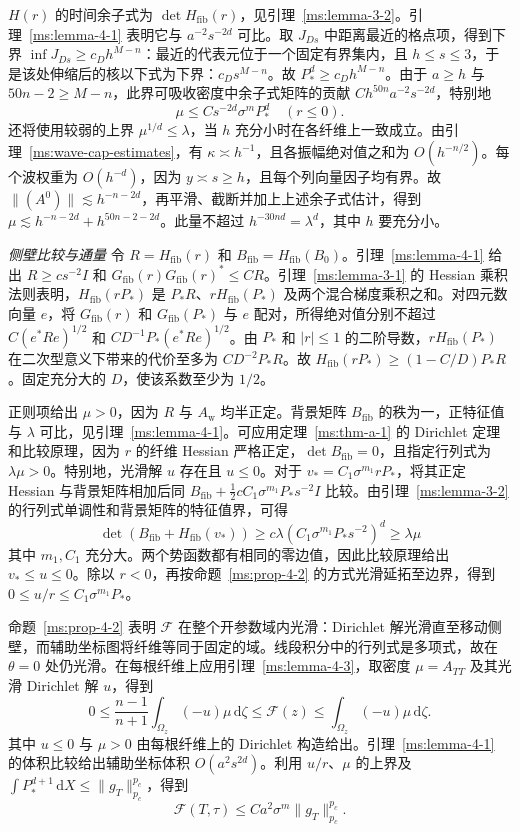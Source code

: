 $H(r)$ 的时间余子式为 $\det H_{\mathrm{fib}}(r)$，见引理~\ref{ms:lemma-3-2}。引理~\ref{ms:lemma-4-1} 表明它与 $a^{-2}s^{-2d}$ 可比。取 $J_{Ds}$ 中距离最近的格点项，得到下界 $\inf J_{Ds}\ge c_D h^{M-n}$：最近的代表元位于一个固定有界集内，且 $h\le s\le3$，于是该处伸缩后的核以下式为下界：$c_Ds^{M-n}$。故 $P_*^d\ge c_Dh^{M-n}$。由于 $a\ge h$ 与 $50n-2\ge M-n$，此界可吸收密度中余子式矩阵的贡献 $Ch^{50n}a^{-2}s^{-2d}$，特别地
\[
\mu\le Cs^{-2d}\sigma^mP_*^d\quad(r\le0).
\]
还将使用较弱的上界 $\mu^{1/d}\le\lambda$，当 $h$ 充分小时在各纤维上一致成立。由引理~\ref{ms:wave-cap-estimates}，有 $\kappa\asymp h^{-1}$，且各振幅绝对值之和为 $O(h^{-n/2})$。每个波权重为 $O(h^{-d})$，因为 $y\asymp s\ge h$，且每个列向量因子均有界。故 $\|(A^0)\|\lesssim h^{-n-2d}$，再平滑、截断并加上上述余子式估计，得到 $\mu\lesssim h^{-n-2d}+h^{50n-2-2d}$。此量不超过 $h^{-30nd}=\lambda^d$，其中 $h$ 要充分小。

\smallskip
\noindent\textit{侧壁比较与通量}
令 $R=H_{\mathrm{fib}}(r)$ 和 $B_{\mathrm{fib}}=H_{\mathrm{fib}}(B_0)$。引理~\ref{ms:lemma-4-1} 给出 $R\ge cs^{-2}I$ 和 $G_{\mathrm{fib}}(r)G_{\mathrm{fib}}(r)^*\le CR$。引理~\ref{ms:lemma-3-1} 的 Hessian 乘积法则表明，$H_{\mathrm{fib}}(rP_*)$ 是 $P_*R$、$rH_{\mathrm{fib}}(P_*)$ 及两个混合梯度乘积之和。对四元数向量 $e$，将 $G_{\mathrm{fib}}(r)$ 和 $G_{\mathrm{fib}}(P_*)$ 与 $e$ 配对，所得绝对值分别不超过 $C(e^*Re)^{1/2}$ 和 $CD^{-1}P_*(e^*Re)^{1/2}$。由 $P_*$ 和 $|r|\le1$ 的二阶导数，$rH_{\mathrm{fib}}(P_*)$ 在二次型意义下带来的代价至多为 $CD^{-2}P_*R$。故 $H_{\mathrm{fib}}(rP_*)\ge(1-C/D)P_*R$。固定充分大的 $D$，使该系数至少为 $1/2$。

正则项给出 $\mu>0$，因为 $R$ 与 $A_{\mathrm w}$ 均半正定。背景矩阵 $B_{\mathrm{fib}}$ 的秩为一，正特征值与 $\lambda$ 可比，见引理~\ref{ms:lemma-4-1}。可应用定理~\ref{ms:thm-a-1} 的 Dirichlet 定理和比较原理，因为 $r$ 的纤维 Hessian 严格正定，$\det B_{\mathrm{fib}}=0$，且指定行列式为 $\lambda\mu>0$。特别地，光滑解 $u$ 存在且 $u\le0$。对于 $v_*=C_1\sigma^{m_1}rP_*$，将其正定 Hessian 与背景矩阵相加后同 $B_{\mathrm{fib}}+\tfrac12 c C_1\sigma^{m_1}P_*s^{-2}I$ 比较。由引理~\ref{ms:lemma-3-2} 的行列式单调性和背景矩阵的特征值界，可得
\[
\det(B_{\mathrm{fib}}+H_{\mathrm{fib}}(v_*))
\ge c\lambda(C_1\sigma^{m_1}P_*s^{-2})^d\ge\lambda\mu
\]
其中 $m_1,C_1$ 充分大。两个势函数都有相同的零边值，因此比较原理给出 $v_*\le u\le0$。除以 $r<0$，再按命题~\ref{ms:prop-4-2} 的方式光滑延拓至边界，得到 $0\le u/r\le C_1\sigma^{m_1}P_*$。

命题~\ref{ms:prop-4-2} 表明 $\mathcal F$ 在整个开参数域内光滑：Dirichlet 解光滑直至移动侧壁，而辅助坐标图将纤维等同于固定的域。线段积分中的行列式是多项式，故在 $\theta=0$ 处仍光滑。在每根纤维上应用引理~\ref{ms:lemma-4-3}，取密度 $\mu=A_{TT}$ 及其光滑 Dirichlet 解 $u$，得到
\[
 0\le \frac{n-1}{n+1}\int_{\Omega_z}(-u)\mu\,\mathrm d\zeta
 \le \mathcal F(z)\le \int_{\Omega_z}(-u)\mu\,\mathrm d\zeta .
\]
其中 $u\le0$ 与 $\mu>0$ 由每根纤维上的 Dirichlet 构造给出。引理~\ref{ms:lemma-4-1} 的体积比较给出辅助坐标体积 $O(a^2s^{2d})$。利用 $u/r$、$\mu$ 的上界及 $\int P_*^{d+1}\,\mathrm dX\le\|g_T\|_{p_c}^{p_c}$，得到
\[
\mathcal F(T,\tau)\le Ca^2\sigma^m\|g_T\|_{p_c}^{p_c}.
\]

